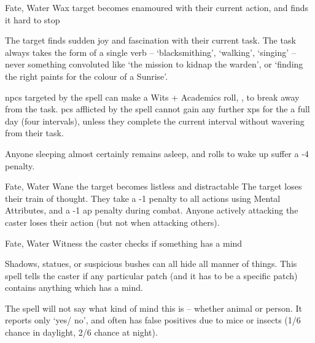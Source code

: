   {Fate, Water}%
  {Wax}%
  {}%
  {}%
  {target becomes enamoured with their current action, and finds it hard to stop}%
  {
    The target finds sudden joy and fascination with their current task.
    The task always takes the form of a single verb -- `blacksmithing', `walking', `singing' -- never something convoluted like `the mission to kidnap the warden', or `finding the right paints for the colour of a Sunrise'.

    \Glspl{npc} targeted by the spell can make a Wits + Academics roll, \tn[8], to break away from the task.
    \Glspl{pc} afflicted by the spell cannot gain any further \glspl{xp} for the a full day (four \glspl{interval}), unless they complete the current \gls{interval} without wavering from their task.

  Anyone sleeping almost certainly remains asleep, and rolls to wake up suffer a -4 penalty.
  }

  {Fate, Water}%
  {Wane}%
  {}%
  {}%
  {the target becomes listless and distractable}%
  {
    The target loses their train of thought.
    They take a -1 penalty to all actions using Mental Attributes, and a -1 \gls{ap} penalty during combat.
    Anyone actively attacking the caster loses their action (but not when attacking others).
  }

  {Fate, Water}%
  {Witness}%
  {}%
  {}%
  {the caster checks if something has a mind}%
  {
    Shadows, statues, or suspicious bushes can all hide all manner of things.
    This spell tells the caster if any particular patch (and it has to be a specific patch) contains anything which has a mind.

    The spell will not say what kind of mind this is -- whether animal or person.
    It reports only `yes/ no', and often has false positives due to mice or insects (1/6 chance in daylight, 2/6 chance at night).
  }

